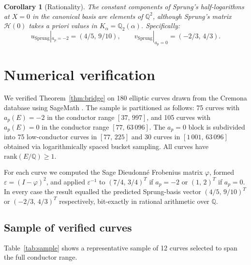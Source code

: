 \documentclass[11pt,a4paper]{amsart}
\newtheorem{corollary}[theorem]{Corollary}
\theoremstyle{definition}
\newcommand{\Q}{\mathbb{Q}}
\newcommand{\eps}{\varepsilon}
\newcommand{\Hcal}{\mathcal{H}}
\begin{document}
\begin{corollary}[Rationality]\label{cor:rationality}
The constant components of Sprung's half-logarithms at $X = 0$ in the canonical basis are elements of $\Q^2$, although Sprung's matrix $\Hcal(0)$ takes a priori values in $K_\alpha = \Q_2(\alpha)$. Specifically:
\begin{equation}
u_{\mathrm{Sprung}}|_{a_p=-2} = (4/5,\, 9/10), \qquad v_{\mathrm{Sprung}}|_{a_p=0} = (-2/3,\, 4/3).
\end{equation}
\end{corollary}

\section{Numerical verification}\label{sec:numerical}

We verified Theorem~\ref{thm:bridge} on 180 elliptic curves drawn from the Cremona database \cite{Cremona} using SageMath \cite{Sage}. The sample is partitioned as follows: 75 curves with $a_p(E) = -2$ in the conductor range $[37,\,997]$, and 105 curves with $a_p(E) = 0$ in the conductor range $[77,\,63\,096]$. The $a_p = 0$ block is subdivided into 75 low-conductor curves in $[77,\,225]$ and 30 curves in $[1\,001,\,63\,096]$ obtained via logarithmically spaced bucket sampling. All curves have $\mathrm{rank}(E/\Q) \geq 1$.

For each curve we computed the Sage Dieudonné Frobenius matrix $\varphi$, formed $\eps = (I - \varphi)^2$, and applied $\eps^{-1}$ to $(7/4,\,3/4)^T$ if $a_p = -2$ or $(1,\,2)^T$ if $a_p = 0$. In every case the result equalled the predicted Sprung-basis vector $(4/5,\,9/10)^T$ or $(-2/3,\,4/3)^T$ respectively, bit-exactly in rational arithmetic over $\Q$.

\subsection{Sample of verified curves}

Table~\ref{tab:sample} shows a representative sample of 12 curves selected to span the full conductor range.
\end{document}
